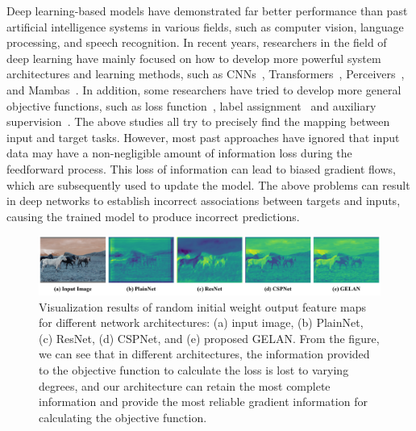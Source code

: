 \documentclass[10pt,twocolumn,letterpaper]{article}
\begin{document}
	Deep learning-based models have demonstrated far better performance than past artificial intelligence systems in various fields, such as computer vision, language processing, and speech recognition.  In recent years, researchers in the field of deep learning have mainly focused on how to develop more powerful system architectures and learning methods, such as CNNs~\cite{he2016deep,he2016identity,szegedy2016rethinking,huang2017densely,xie2017aggregated,liu2022convnext,woo2023convnext}, Transformers~\cite{dosovitskiy2021image,wang2021pyramid,wang2022pvt,liu2021swin,liu2022swin,ding2022davit,tu2022maxvit}, Perceivers~\cite{jaegle2021perceiver,jaegle2021perceiver,zhu2022uni,li2023uni,zhu2022uni,shridhar2023perceiver,tang2023perceiver}, and Mambas~\cite{gu2023mamba,zhu2024vision,liu2024vmamba}.  In addition, some researchers have tried to develop more general objective functions, such as loss function~\cite{zhou2019iou,rezatofighi2019generalized,chen2020ap, oksuz2020ranking,zheng2020distance,oksuz2021rank}, label assignment~\cite{zhu2020autoassign,ge2021ota,feng2021tood,wang2021end,li2022dual} and auxiliary supervision~\cite{lee2015deeply,szegedy2015going,wang2015training,shen2019object,levinshtein2020datnet,hayder2017boundary,huang2022monodtr,zhang2023monodetr,guo2020augfpn}.  The above studies all try to precisely find the mapping between input and target tasks.  However, most past approaches have ignored that input data may have a non-negligible amount of information loss during the feedforward process. This loss of information can lead to biased gradient flows, which are subsequently used to update the model. The above problems can result in deep networks to establish incorrect associations between targets and inputs, causing the trained model to produce incorrect predictions.

	\begin{figure}[t]
		\begin{center}
			\includegraphics[width=1.\linewidth]{figs/concept}
		\end{center}
		\vspace{-14pt}
		\caption{Visualization results of random initial weight output feature maps for different network architectures: (a) input image, (b) PlainNet, (c) ResNet, (d) CSPNet, and (e) proposed GELAN.  From the figure, we can see that in different architectures, the information provided to the objective function to calculate the loss is lost to varying degrees, and our architecture can retain the most complete information and provide the most reliable gradient information for calculating the objective function.}	
		\vspace{-20pt}
		\label{fig:concept}
	\end{figure}
\end{document}
